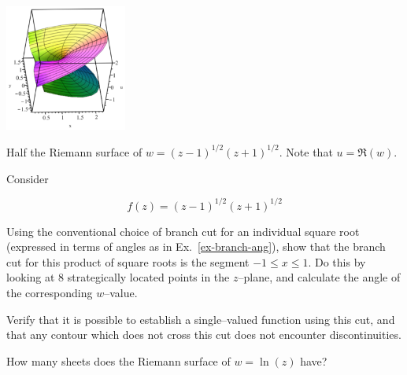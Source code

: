 \begin{exer}
\label{ex-product-roots}
\begin{marginfigure}[0.5cm]
\centering
\includegraphics[width=4cm]{complex/figures/riemann2}
\caption{Half the Riemann surface of $w=(z-1)^{1/2}(z+1)^{1/2}$. Note that $u=\Re(w)$. }
\label{fig-riemann2}
\end{marginfigure}
Consider

$$f(z)=(z-1)^{1/2}(z+1)^{1/2}$$

Using the conventional choice of branch cut for an individual square root (expressed in terms of angles as in Ex.~\ref{ex-branch-ang}), show that the branch cut for this product of square roots is the segment $-1 \le x \le 1$. Do this by looking at 8 strategically located points in the $z$--plane, and calculate the angle of the corresponding $w$--value.


Verify that it is possible to establish a single--valued function using this cut, and that any contour which does not cross this cut does not encounter discontinuities.
\end{exer}

\begin{exer}
How many sheets does the Riemann surface of $w=\ln(z)$ have?
\end{exer}

